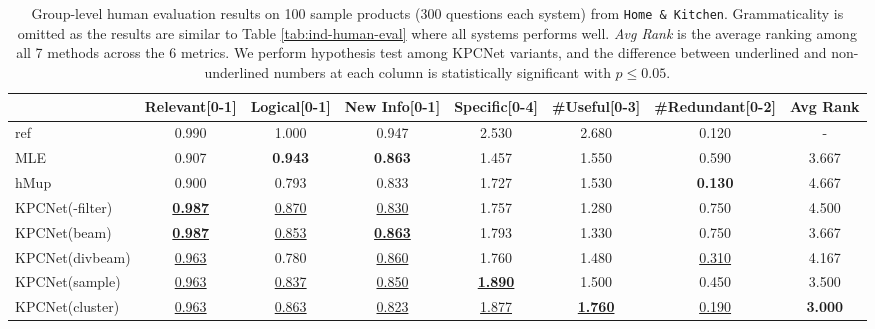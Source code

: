 \begin{table}[htbp]
  \centering
  \small
  \begin{tabular}{l|ccccccc}
    \hline
    {} & Relevant\tiny{[0-1]} & Logical\tiny{[0-1]} & New Info\tiny{[0-1]} & Specific\tiny{[0-4]} & \#Useful\tiny{[0-3]} & \#Redundant\tiny{[0-2]} & Avg Rank \\
    \hline
    ref          &    0.990 &   1.000 &    0.947 &    2.530 &   2.680 &      0.120 & - \\
    \hline
    MLE          &    0.907 &   \textbf{0.943} &    \textbf{0.863} &    1.457 &   1.550 &      0.590 & 3.667 \\
    hMup         &    0.900 &   0.793 &    0.833 &    1.727 &   1.530 &     \textbf{0.130} & 4.667 \\
    \hline
    KPCNet(-filter)  &    \underline{\textbf{0.987}} &   \underline{0.870} &    \underline{0.830} &    1.757 &   1.280 &      0.750 & 4.500 \\
    KPCNet(beam)    &    \underline{\textbf{0.987}} &   \underline{0.853} &    \underline{\textbf{0.863}} &    1.793 &   1.330 &      0.750 & 3.667 \\
    KPCNet(divbeam) &    \underline{0.963} &   0.780 &    \underline{0.860} &    1.760 &   1.480 &  \underline{0.310} & 4.167 \\
    KPCNet(sample)  &    \underline{0.963} &   \underline{0.837} &    \underline{0.850} &    \underline{\textbf{1.890}} &   1.500 &      0.450 & 3.500 \\
    KPCNet(cluster)  &    \underline{0.963} &   \underline{0.863} &    \underline{0.823} &    \underline{1.877} &   \underline{\textbf{1.760}} &      \underline{0.190} & \textbf{3.000} \\
    \hline
    \end{tabular}
  \caption{\label{tab:group-human-eval} Group-level human evaluation results on 100 sample products (300 questions each system) from \texttt{Home \& Kitchen}. Grammaticality is omitted as the results are similar to Table \ref{tab:ind-human-eval} where all systems performs well. \textit{Avg Rank} is the average ranking among all 7 methods across the 6 metrics. We perform hypothesis test among KPCNet variants, and the difference between underlined and non-underlined numbers at each column is statistically significant with $p \leq 0.05$.}
  \end{table}

